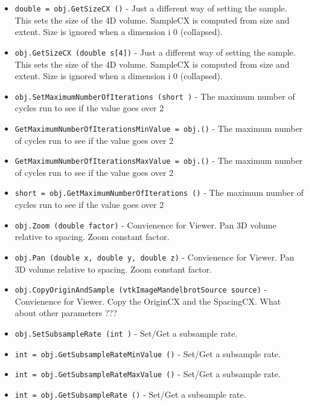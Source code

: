 \begin{itemize}
\item  \verb|double = obj.GetSizeCX ()| -  Just a different way of setting the sample.  
 This sets the size of the 4D volume. 
 SampleCX is computed from size and extent.
 Size is ignored when a dimension i 0 (collapsed).

\item  \verb|obj.GetSizeCX (double s[4])| -  Just a different way of setting the sample.  
 This sets the size of the 4D volume. 
 SampleCX is computed from size and extent.
 Size is ignored when a dimension i 0 (collapsed).

\item  \verb|obj.SetMaximumNumberOfIterations (short )| -  The maximum number of cycles run to see if the value goes over 2

\item  \verb|GetMaximumNumberOfIterationsMinValue = obj.()| -  The maximum number of cycles run to see if the value goes over 2

\item  \verb|GetMaximumNumberOfIterationsMaxValue = obj.()| -  The maximum number of cycles run to see if the value goes over 2

\item  \verb|short = obj.GetMaximumNumberOfIterations ()| -  The maximum number of cycles run to see if the value goes over 2

\item  \verb|obj.Zoom (double factor)| -  Convienence for Viewer.  Pan 3D volume relative to spacing. 
 Zoom constant factor.

\item  \verb|obj.Pan (double x, double y, double z)| -  Convienence for Viewer.  Pan 3D volume relative to spacing. 
 Zoom constant factor.

\item  \verb|obj.CopyOriginAndSample (vtkImageMandelbrotSource source)| -  Convienence for Viewer.  Copy the OriginCX and the SpacingCX.
 What about other parameters ???

\item  \verb|obj.SetSubsampleRate (int )| -  Set/Get a subsample rate.

\item  \verb|int = obj.GetSubsampleRateMinValue ()| -  Set/Get a subsample rate.

\item  \verb|int = obj.GetSubsampleRateMaxValue ()| -  Set/Get a subsample rate.

\item  \verb|int = obj.GetSubsampleRate ()| -  Set/Get a subsample rate.

\end{itemize}
